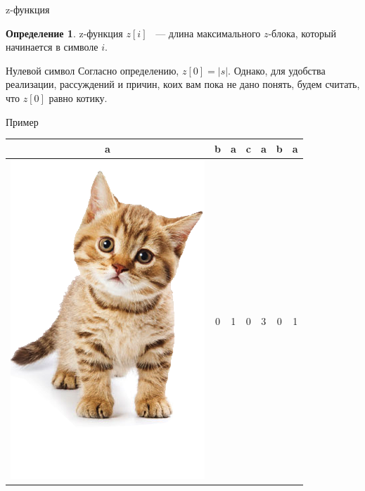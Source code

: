\documentclass{beamer}
\theoremstyle{definition}
\newtheorem{mydef}[theorem]{Определение}
\begin{document}
\begin{frame}{z-функция}

\begin{mydef}
\alert{z-функция} $z[i]$ ~--- длина максимального $z$-блока, который начинается в символе $i$. 
\end{mydef}

\begin{alertblock}{Нулевой символ}
Согласно определению, $z[0] = |s|$. Однако, для удобства реализации, рассуждений и причин, коих вам пока не дано понять, будем считать, что $z[0]$ равно котику.
\end{alertblock}

\begin{exampleblock}{Пример}
\begin{center}
\begin{tabular}{|c|c|c|c|c|c|c|}
\hline 
a & b & a & c & a & b & a \\ 
\hline 
\includegraphics[scale=0.06]{cat.png} & 0 & 1 & 0 & 3 & 0 & 1 \\ 
\hline 
\end{tabular} 
\end{center}
\end{exampleblock}

\begin{center}

\end{center}

\end{frame}
\end{document}
